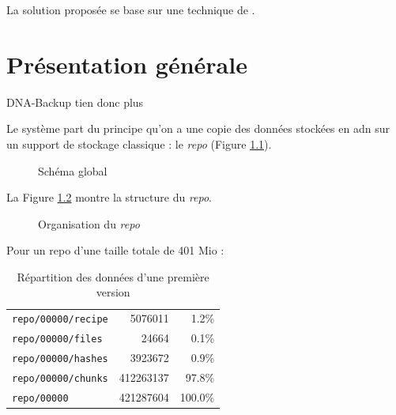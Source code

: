 \documentclass[a4paper]{report}
\begin{document}
La solution proposée se base sur une technique de  \cite{shilane2012wan}.

\chapter{Présentation générale}

DNA-Backup tien donc plus 

Le système part du principe qu'on a une copie des données stockées en
\ac{adn} sur un support de stockage classique : le \emph{repo} (Figure \ref{fig:big-picture}).
\begin{figure}[ht]
\centering


\caption{Schéma global}
\label{fig:big-picture}
\end{figure}

La Figure \ref{fig:repo-dir-tree} montre la structure du \emph{repo}. 

\begin{figure}
\caption{Organisation du \emph{repo}}
\label{fig:repo-dir-tree}
\end{figure}

Pour un repo d'une taille totale de 401 Mio :

\begin{table}[ht]
\centering
\begin{tabular}{l r r}
\verb|repo/00000/recipe| &   5076011 &   1.2\% \\
\verb|repo/00000/files| &      24664 &   0.1\% \\
\verb|repo/00000/hashes| &   3923672 &   0.9\% \\
\verb|repo/00000/chunks| & 412263137 &  97.8\% \\
\verb|repo/00000| &        421287604 & 100.0\% \\
\end{tabular}
\caption{Répartition des données d'une première version}
\label{fig:repo-data-distribution}
\end{table}
\end{document}
